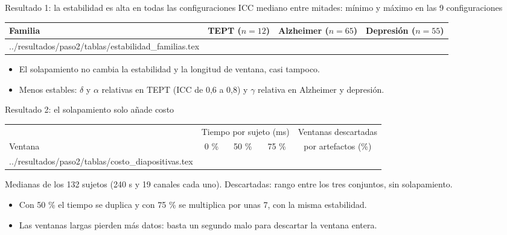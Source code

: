 \documentclass[aspectratio=169,11pt]{beamer}
\makeatletter
\newcommand{\tabla}[1]{\@@input ../resultados/paso2/tablas/#1 }
\makeatother
\begin{document}
\begin{frame}{Resultado 1: la estabilidad es alta en todas las configuraciones}
  \centering\small
  ICC mediano entre mitades: mínimo y máximo en las 9 configuraciones\\[2mm]
  \begin{tabular}{@{}lccc@{}}
    \toprule
    Familia & TEPT ($n = 12$) & Alzheimer ($n = 65$) & Depresión ($n = 55$) \\
    \midrule
    \tabla{estabilidad_familias.tex}
    \bottomrule
  \end{tabular}

  \vspace{4mm}
  \raggedright
  \begin{itemize}\small
    \item El solapamiento no cambia la estabilidad y la longitud de ventana, casi tampoco.
    \item Menos estables: $\delta$ y $\alpha$ relativas en TEPT (ICC de 0,6 a 0,8) y $\gamma$ relativa en Alzheimer y depresión.
  \end{itemize}
\end{frame}

\begin{frame}{Resultado 2: el solapamiento solo añade costo}
  \centering\small
  \begin{tabular}{@{}lcccc@{}}
    \toprule
     & \multicolumn{3}{c}{Tiempo por sujeto (ms)} & Ventanas descartadas \\
    \cmidrule(lr){2-4}
    Ventana & 0 \% & 50 \% & 75 \% & por artefactos (\%) \\
    \midrule
    \tabla{costo_diapositivas.tex}
    \bottomrule
  \end{tabular}

  {\footnotesize Medianas de los 132 sujetos (240 s y 19 canales cada uno). Descartadas: rango entre los tres conjuntos, sin solapamiento.}

  \vspace{1mm}
  \raggedright
  \begin{itemize}\small
    \item Con 50 \% el tiempo se duplica y con 75 \% se multiplica por unas 7, con la misma estabilidad.
    \item Las ventanas largas pierden más datos: basta un segundo malo para descartar la ventana entera.
  \end{itemize}
\end{frame}
\end{document}
